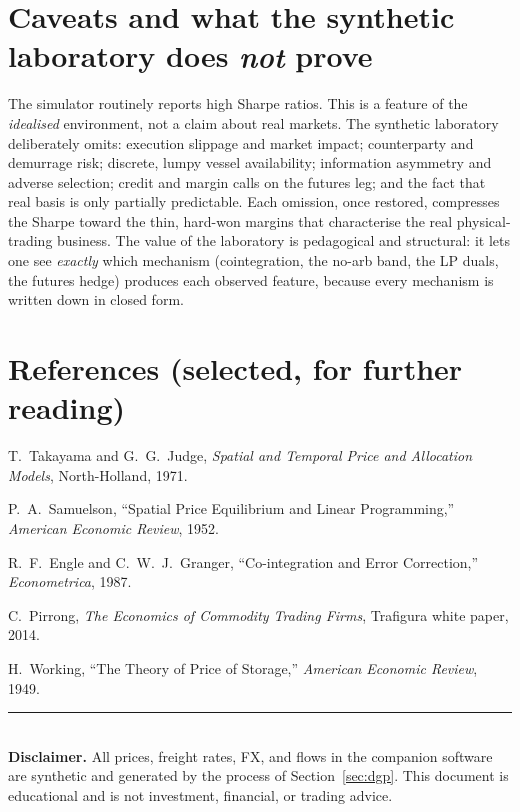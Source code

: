 \documentclass[11pt]{article}
\theoremstyle{definition}
\theoremstyle{plain}
\begin{document}
\section{Caveats and what the synthetic laboratory does \emph{not} prove}

The simulator routinely reports high Sharpe ratios. This is a feature of the
\emph{idealised} environment, not a claim about real markets. The synthetic
laboratory deliberately omits: execution slippage and market impact;
counterparty and demurrage risk; discrete, lumpy vessel availability;
information asymmetry and adverse selection; credit and margin calls on the
futures leg; and the fact that real basis is only partially predictable. Each
omission, once restored, compresses the Sharpe toward the thin, hard-won
margins that characterise the real physical-trading business. The value of the
laboratory is pedagogical and structural: it lets one see \emph{exactly} which
mechanism (cointegration, the no-arb band, the LP duals, the futures hedge)
produces each observed feature, because every mechanism is written down in
closed form.

\section*{References (selected, for further reading)}
\small
\begin{enumerate}[label={[\arabic*]},leftmargin=*]
\item T.~Takayama and G.~G.~Judge, \emph{Spatial and Temporal Price and
Allocation Models}, North-Holland, 1971.
\item P.~A.~Samuelson, ``Spatial Price Equilibrium and Linear Programming,''
\emph{American Economic Review}, 1952.
\item R.~F.~Engle and C.~W.~J.~Granger, ``Co-integration and Error Correction,''
\emph{Econometrica}, 1987.
\item C.~Pirrong, \emph{The Economics of Commodity Trading Firms}, Trafigura
white paper, 2014.
\item H.~Working, ``The Theory of Price of Storage,'' \emph{American Economic
Review}, 1949.
\end{enumerate}

\vfill
\noindent\rule{\linewidth}{0.4pt}\\
{\footnotesize\textbf{Disclaimer.} All prices, freight rates, FX, and flows in
the companion software are synthetic and generated by the process of
Section~\ref{sec:dgp}. This document is educational and is not investment,
financial, or trading advice.}
\end{document}
